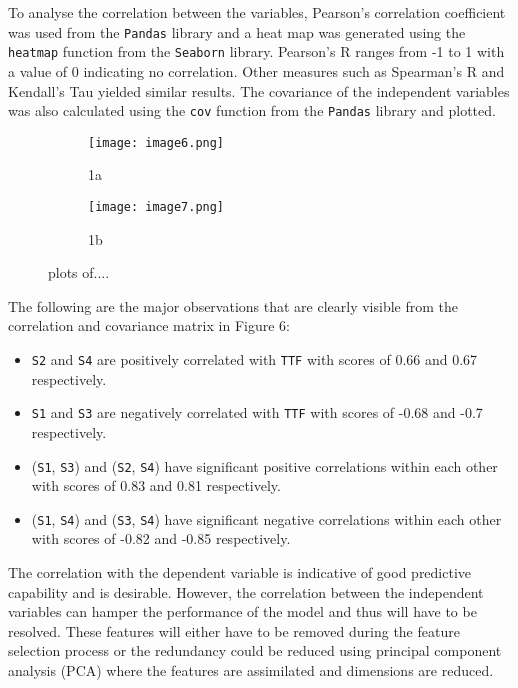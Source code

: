 \documentclass{article}
\begin{document}
To analyse the correlation between the variables, Pearson's correlation coefficient was used from the \texttt{Pandas} library and a heat map was generated using the \texttt{heatmap} function from the \texttt{Seaborn} library.
Pearson's R ranges from -1 to 1 with a value of 0 indicating no correlation. Other measures such as Spearman's R and Kendall's Tau yielded similar results.
The covariance of the independent variables was also calculated using the \texttt{cov} function from the \texttt{Pandas} library and plotted.
\begin{figure}[h]
	\begin{subfigure}{.5\textwidth}
		\centering
		\texttt{[image: image6.png]}
		\caption{1a}
		\label{fig:sfig1}
	\end{subfigure}%
	\begin{subfigure}{.5\textwidth}
		\centering
		\texttt{[image: image7.png]}
		\caption{1b}
		\label{fig:sfig2}
	\end{subfigure}
	\caption{plots of....}
	\label{fig:fig}
\end{figure}

The following are the major observations that are clearly visible from the correlation and covariance matrix in Figure 6:
\begin{itemize}[topsep=0pt]
	\item \texttt{S2} and \texttt{S4} are positively correlated with \texttt{TTF} with scores of 0.66 and 0.67 respectively.
	\item \texttt{S1} and \texttt{S3} are negatively correlated with \texttt{TTF} with scores of -0.68 and -0.7 respectively.
	\item (\texttt{S1}, \texttt{S3}) and (\texttt{S2}, \texttt{S4}) have significant positive correlations within each other with scores of 0.83 and 0.81 respectively.
	\item (\texttt{S1}, \texttt{S4}) and (\texttt{S3}, \texttt{S4}) have significant negative correlations within each other with scores of -0.82 and -0.85 respectively.
\end{itemize}
The correlation with the dependent variable is indicative of good predictive capability and is desirable.
However, the correlation between the independent variables can hamper the performance of the model and thus will have to be resolved.
These features will either have to be removed during the feature selection process or the redundancy could be reduced using principal component analysis (PCA) where the features are assimilated and dimensions are reduced.
\end{document}
